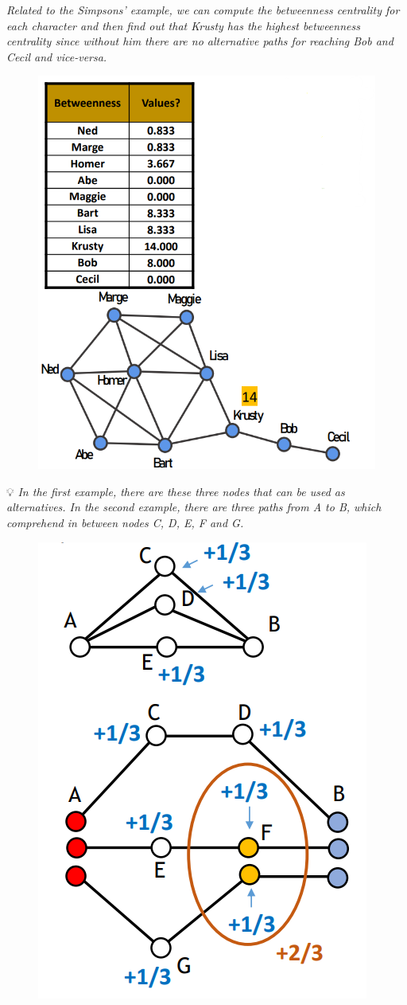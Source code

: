 \documentclass[
  notitlepage,
  onecolumn,
  openany]{book}
\begin{document}
\emph{Related to the Simpsons' example, we can compute the betweenness centrality for each character and then find out that Krusty has the highest betweenness centrality since without him there are no alternative paths for reaching Bob and Cecil and vice-versa.}

\begin{figure}[h!]

{\centering \includegraphics[width=0.5\linewidth]{images/04-Centrality/Untitled 5} 

}

\end{figure}

💡 \emph{In the first example, there are these three nodes that can be used as alternatives. In the second example, there are three paths from A to B, which comprehend in between nodes C, D, E, F and G.}

\begin{figure}[h!]

{\centering \includegraphics[width=0.3\linewidth]{images/04-Centrality/Untitled 6} 

}

\end{figure}
\end{document}
